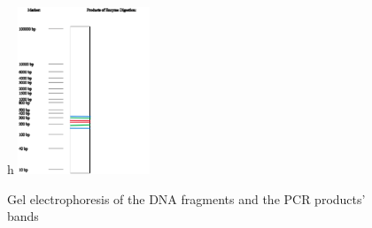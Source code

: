 \begin{figure}{h}
    \centering
    \includegraphics[width=0.35\textwidth]{Figures/Exc4sub6.png}
    \caption{Gel electrophoresis of the DNA fragments and the PCR products' bands}
    \label{fig:Exc4sub6}
\end{figure}
